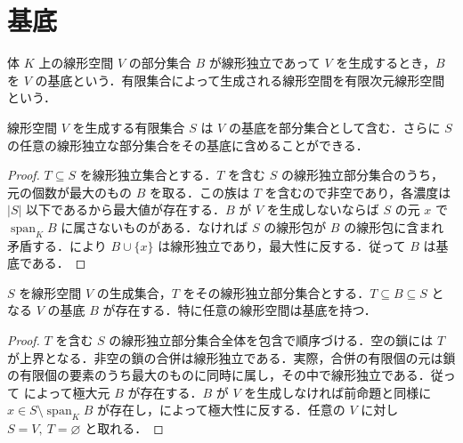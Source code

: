 \section{基底}
\begin{defn}[線形空間の基底]
体 $K$ 上の線形空間 $V$ の部分集合 $B$ が線形独立であって $V$ を生成するとき，$B$ を $V$ の基底という．有限集合によって生成される線形空間を有限次元線形空間という．
\end{defn}
\begin{prop}[有限生成集合からの基底の抽出]
線形空間 $V$ を生成する有限集合 $S$ は $V$ の基底を部分集合として含む．さらに $S$ の任意の線形独立な部分集合をその基底に含めることができる．
\end{prop}
\begin{proof}
$T\subseteq S$ を線形独立集合とする．$T$ を含む $S$ の線形独立部分集合のうち，元の個数が最大のもの $B$ を取る．この族は $T$ を含むので非空であり，各濃度は $|S|$ 以下であるから最大値が存在する．$B$ が $V$ を生成しないならば $S$ の元 $x$ で $\operatorname{span}_K B$ に属さないものがある．なければ $S$ の線形包が $B$ の線形包に含まれ矛盾する．により $B\cup\{x\}$ は線形独立であり，最大性に反する．従って $B$ は基底である．
\end{proof}
\begin{prop}[基底の拡張]
$S$ を線形空間 $V$ の生成集合，$T$ をその線形独立部分集合とする．$T\subseteq B\subseteq S$ となる $V$ の基底 $B$ が存在する．特に任意の線形空間は基底を持つ．
\end{prop}
\begin{proof}
$T$ を含む $S$ の線形独立部分集合全体を包含で順序づける．空の鎖には $T$ が上界となる．非空の鎖の合併は線形独立である．実際，合併の有限個の元は鎖の有限個の要素のうち最大のものに同時に属し，その中で線形独立である．従って によって極大元 $B$ が存在する．$B$ が $V$ を生成しなければ前命題と同様に $x\in S\setminus\operatorname{span}_K B$ が存在し，によって極大性に反する．任意の $V$ に対し $S=V,\ T=\varnothing$ と取れる．
\end{proof}
